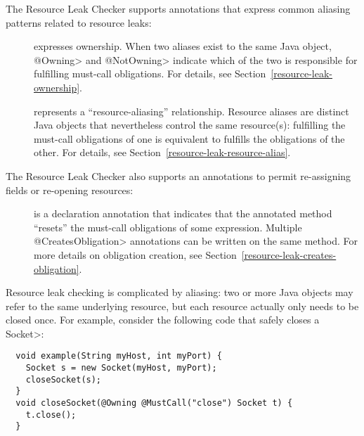 The Resource Leak Checker supports annotations that express common
aliasing patterns related to resource leaks:

\begin{description}

\item[]
\item[]
  expresses ownership.  When two aliases exist to the same Java object,
  \<@Owning> and \<@NotOwning> indicate which of the two is responsible for
  fulfilling must-call obligations.  For details, see
  Section~\ref{resource-leak-ownership}.

\item[]
  represents a ``resource-aliasing'' relationship.  Resource aliases are
  distinct Java objects that nevertheless control the same resource(s):
  fulfilling the must-call obligations of one is equivalent to
  fulfills the obligations of the other.  For details,
  see Section~\ref{resource-leak-resource-alias}.

\end{description}

The Resource Leak Checker also supports an annotations to permit re-assigning
fields or re-opening resources:

\begin{description}

\item[]
  is a declaration annotation that indicates that the annotated method ``resets'' the must-call
  obligations of some expression.  Multiple \<@CreatesObligation>
  annotations can be written on the same method.  For more details
  on obligation creation, see Section~\ref{resource-leak-creates-obligation}.

\end{description}



Resource leak checking is complicated by aliasing: two or more Java
objects may refer to the same underlying resource, but each resource
actually only needs to be closed once.
For example, consider the following code that safely closes a \<Socket>:

\begin{verbatim}
  void example(String myHost, int myPort) {
    Socket s = new Socket(myHost, myPort);
    closeSocket(s);
  }
  void closeSocket(@Owning @MustCall("close") Socket t) {
    t.close();
  }
\end{verbatim}

